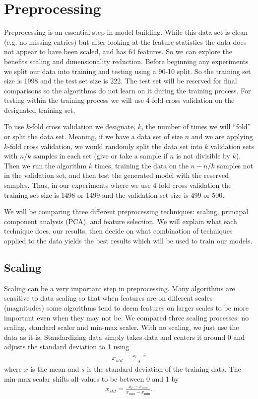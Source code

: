\documentclass[12pt]{article}
\begin{document}
\FloatBarrier

\section{Preprocessing}

Preprocessing is an essential step in model building. While this data set is clean (e.g. no missing entries) but after looking at the feature statistics the data does not appear to have been scaled, and has 64 features. So we can explore the benefits scaling and dimensionality reduction. Before beginning any experiments we split our data into training and testing using a 90-10 split. So the training set size is 1998 and the test set size is 222. The test set will be reserved for final comparisons so the algorithms do not learn on it during the training process. For testing within the training process we will use 4-fold cross validation on the designated training set.

To use $k$-fold cross validation we designate, $k$, the number of times we will ``fold'' or split the data set. Meaning, if we have a data set of size $n$ and we are applying $k$-fold cross validation, we would randomly split the data set into $k$ validation sets with $n/k$ samples in each set (give or take a sample if $n$ is not divisible by $k$). Then we run the algorithm $k$ times, training the data on the $n-n/k$ samples not in the validation set, and then test the generated model with the reserved samples. Thus, in our experiments where we use 4-fold cross validation the training set size is 1498 or 1499 and the validation set size is 499 or 500.

We will be comparing three different preprocessing techniques: scaling, principal component analysis (PCA), and feature selection. We will explain what each technique does, our results, then decide on what combination of techniques applied to the data yields the best results which will be used to train our models.

\subsection{Scaling}

Scaling can be a very important step in preprocessing. Many algorithms are sensitive to data scaling so that when features are on different scales (magnitudes) some algorithms tend to deem features on larger scales to be more important even when they may not be. We compared three scaling processes: no scaling, standard scaler and min-max scaler. With no scaling, we just use the data as it is. Standardizing data simply takes data and centers it around 0 and adjusts the standard deviation to 1 using
\begin{align*}
	x_{std}=\frac{x_i-\overline{x}}{s}
\end{align*}
where $ \overline{x}$ is the mean and $s$ is the standard deviation of the training data. The min-max scalar shifts all values to be between 0 and 1 by
\begin{align*}
	x_{std}=\frac{x_i-x_{\min}}{x_{\max}-x_{\min}}.
\end{align*}
\end{document}
